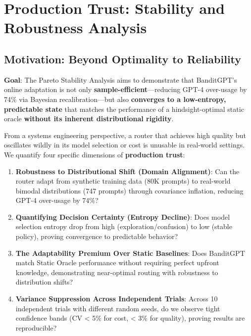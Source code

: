 
\section{Production Trust: Stability and Robustness Analysis}
\label{sec:pareto_analysis}

\subsection{Motivation: Beyond Optimality to Reliability}

\textbf{Goal}: The Pareto Stability Analysis aims to demonstrate that BanditGPT's online adaptation is not only \textbf{sample-efficient}—reducing GPT-4 over-usage by 74\% via Bayesian recalibration—but also \textbf{converges to a low-entropy, predictable state} that matches the performance of a hindsight-optimal static oracle \textbf{without its inherent distributional rigidity}.

From a systems engineering perspective, a router that achieves high quality but oscillates wildly in its model selection or cost is unusable in real-world settings. We quantify four specific dimensions of \textbf{production trust}:

\begin{enumerate}
    \item \textbf{Robustness to Distributional Shift (Domain Alignment)}: Can the router adapt from synthetic training data (80K prompts) to real-world bimodal distributions (747 prompts) through covariance inflation, reducing GPT-4 over-usage by 74\%?
    
    \item \textbf{Quantifying Decision Certainty (Entropy Decline)}: Does model selection entropy drop from high (exploration/confusion) to low (stable policy), proving convergence to predictable behavior?
    
    \item \textbf{The Adaptability Premium Over Static Baselines}: Does BanditGPT match Static Oracle performance without requiring perfect upfront knowledge, demonstrating near-optimal routing with robustness to distribution shifts?
    
    \item \textbf{Variance Suppression Across Independent Trials}: Across 10 independent trials with different random seeds, do we observe tight confidence bands (CV < 5\% for cost, < 3\% for quality), proving results are reproducible?
\end{enumerate}

